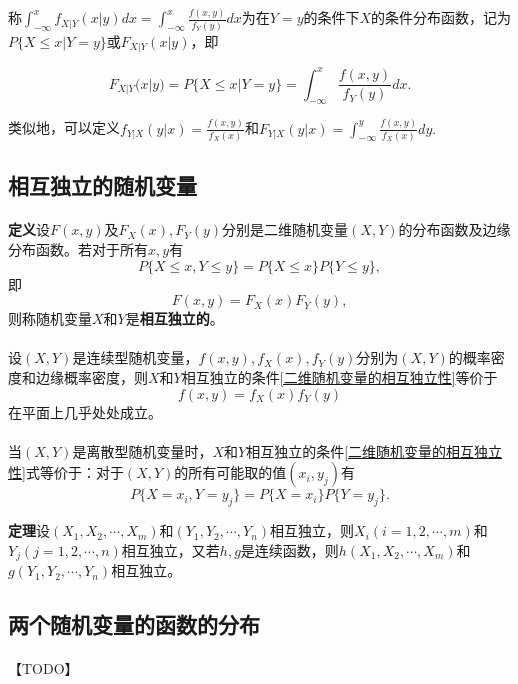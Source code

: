 称$\int_{-\infty}^x f_{X|Y}(x|y)dx = \int_{-\infty}^x \frac{f(x,y)}{f_Y(y)}dx$为在$Y=y$的条件下$X$的条件分布函数，记为$P\{X \leq  x | Y = y\}$或$F_{X|Y}(x|y)$，即

\begin{equation}
  F_{X|Y}(x|y) = P\{X \leq x | Y = y\}=\int_{-\infty}^x\frac{f(x,y)}{f_Y(y)}dx.
\end{equation}

类似地，可以定义$f_{Y|X}(y|x)=\frac{f(x,y)}{f_X(x)}$和$F_{Y|X}(y|x)=\int_{-\infty}^y\frac{f(x,y)}{f_X(x)}dy.$

\subsection{相互独立的随机变量}
\paragraph{}
\textbf{定义\;}设$F(x,y)$及$F_X(x),F_Y(y)$分别是二维随机变量$(X,Y)$的分布函数及边缘分布函数。若对于所有$x,y$有
\begin{equation}
  P\{X \leq x, Y \leq y\} = P\{X \leq x\}P\{Y \leq y\},
\end{equation}
即
\begin{equation}
  \label{二维随机变量的相互独立性}
  F(x,y) = F_X(x)F_Y(y),
\end{equation}
则称随机变量$X$和$Y$是\textbf{相互独立的}。

\paragraph{}
设$(X,Y)$是连续型随机变量，$f(x,y), f_X(x), f_Y(y)$分别为$(X,Y)$的概率密度和边缘概率密度，则$X$和$Y$相互独立的条件\eqref{二维随机变量的相互独立性}等价于
\begin{equation}
  f(x,y)=f_X(x)f_Y(y)
\end{equation}
在平面上几乎处处成立。

\paragraph{}
当$(X,Y)$是离散型随机变量时，$X$和$Y$相互独立的条件\eqref{二维随机变量的相互独立性}式等价于：对于$(X,Y)$的所有可能取的值$(x_i,y_j)$有
\begin{equation}
  P\{X=x_i,Y=y_j\} = P\{X=x_i\}P\{Y=y_j\}.
\end{equation}

\textbf{定理\;}设$(X_1, X_2, \cdots, X_m)$和$(Y_1, Y_2, \cdots, Y_n)$相互独立，则$X_i(i=1,2, \cdots, m)$和$Y_j(j=1,2, \cdots, n)$相互独立，又若$h,g$是连续函数，则$h(X_1,X_2, \cdots, X_m)$和$g(Y_1, Y_2, \cdots, Y_n)$相互独立。

\subsection{两个随机变量的函数的分布}
\paragraph{}
【TODO】

